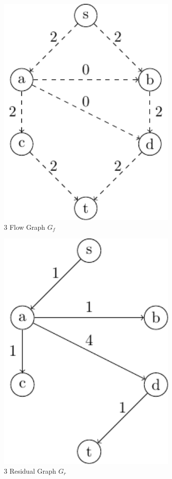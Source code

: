 \begin{minipage}{0.2\textwidth}
\begin{figure}[H]
  \centering
  \includegraphics[width=0.8\textwidth]{Figure/maxflow_d1_6.pdf}
  \caption*{3 Flow Graph \(G_f\)}
\end{figure}
\end{minipage}
\begin{minipage}{0.2\textwidth}
\begin{figure}[H]
  \centering
  \includegraphics[width=0.8\textwidth]{Figure/maxflow_d1_7.pdf}
  \caption*{3 Residual Graph \(G_r\)}
\end{figure}
\end{minipage}
